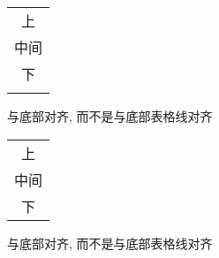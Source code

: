 \documentclass [nofonts] {ctexart}
\begin{document}
\begin {tabular} [b] {|c|}
\firsthline
上	\\
中间\\
下	\\
\lasthline
\end {tabular}
与底部对齐, 而不是与底部表格线对齐

\begin {tabular} [b] {|c|}
\hline
上	\\
中间\\
下	\\
\hline
\end {tabular}
与底部对齐, 而不是与底部表格线对齐
\end{document}
